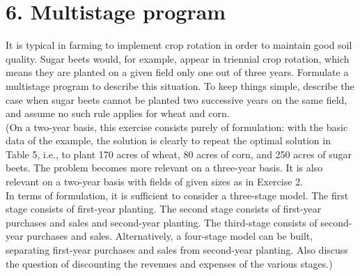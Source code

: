 \documentclass{article}
\theoremstyle{definition}
\theoremstyle{definition}
\theoremstyle{remark}
\begin{document}
\section*{6. Multistage program}
It is typical in farming to implement crop rotation in order to maintain
good soil quality. Sugar beets would, for example, appear in
triennial crop rotation, which means they are planted on a given field
only one out of three years. Formulate a multistage program to describe
this situation. To keep things simple, describe the case when sugar beets cannot be planted two successive years on the same field,
and assume no such rule applies for wheat and corn.
\\
(On a two-year basis, this exercise consists purely of formulation:
with the basic data of the example, the solution is clearly to repeat
the optimal solution in Table 5, i.e., to plant 170 acres of wheat, 80
acres of corn, and 250 acres of sugar beets. The problem becomes
more relevant on a three-year basis. It is also relevant on a two-year
basis with fields of given sizes as in Exercise 2.
\\
In terms of formulation, it is sufficient to consider a three-stage
model. The first stage consists of first-year planting. The second stage
consists of first-year purchases and sales and second-year planting.
The third-stage consists of second-year purchases and sales. Alternatively,
a four-stage model can be built, separating first-year purchases
and sales from second-year planting. Also discuss the question of discounting
the revenues and expenses of the various stages.)
\end{document}
